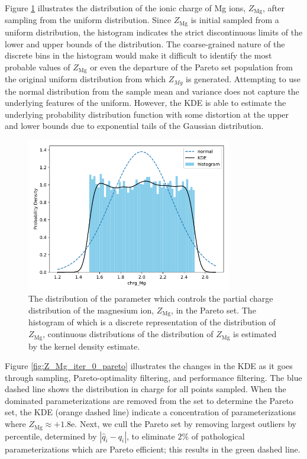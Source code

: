 Figure \ref{fig:Z_Mg_iter_0} illustrates the distribution of the ionic charge of Mg ions, $Z_{\text{Mg}}$, after sampling from the uniform distribution.  Since $Z_{\text{Mg}}$ is initial sampled from a uniform distribution, the histogram indicates the strict discontinuous limits of the lower and upper bounds of the distribution.  The coarse-grained nature of the discrete bins in the histogram would make it difficult to identify the most probable values of $Z_{\text{Mg}}$ or even the departure of the Pareto set population from the original uniform distribution from which $Z_{Mg}$ is generated.  Attempting to use the normal distribution from the sample mean and variance does not capture the underlying features of the uniform.  However, the KDE is able to estimate the underlying probability distribution function with some distortion at the upper and lower bounds due to exponential tails of the Gaussian distribution.

\begin{figure}[ht]
	\centering
  \includegraphics[width=0.8\textwidth]{chapter7/Z_Mg_iter_0}
  \caption{The distribution of the parameter which controls the partial charge distribution of the magnesium ion, $Z_{\text{Mg}}$, in the Pareto set. The histogram of which is a discrete representation of the distribution of $Z_{\text{Mg}}$, continuous distributions of the distribution of $Z_{\text{Mg}}$ is estimated by the kernel density estimate.}
  \label{fig:Z_Mg_iter_0}
\end{figure}

Figure \ref{fig:Z_Mg_iter_0_pareto} illustrates the changes in the KDE as it goes through sampling, Pareto-optimality filtering, and performance filtering.  The blue dashed line shows the distribution in charge for all points sampled. When the dominated parameterizations are removed from the set to determine the Pareto set, the KDE (orange dashed line) indicate a concentration of parameterizations where $Z_{\text{Mg}} \approx +1.8 \text{e}$.  Next, we cull the Pareto set by removing largest outliers by percentile, determined by $|\hat{q}_i -q_i|$, to eliminate $2$\% of pathological parameterizations which are Pareto efficient; this results in the green dashed line.


